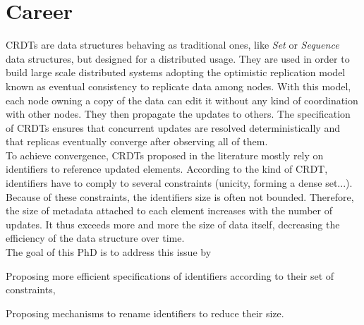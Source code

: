\documentclass[]{deedy-resume-openfont}
\begin{document}
%
%

%
%

%
%


\section{Career}

\sectionsep

\hfill\begin{minipage}{\dimexpr\textwidth-0.5cm}

\acp{CRDT} are data structures behaving as traditional ones, like \emph{Set} or \emph{Sequence} data structures, but designed for a distributed usage.
They are used in order to build large scale distributed systems adopting the optimistic replication model known as eventual consistency to replicate data among nodes.
With this model, each node owning a copy of the data can edit it without any kind of coordination with other nodes.
They then propagate the updates to others.
The specification of \acp{CRDT} ensures that concurrent updates are resolved deterministically and that replicas eventually converge after observing all of them.
\\
To achieve convergence, \acp{CRDT} proposed in the literature mostly rely on identifiers to reference updated elements.
According to the kind of \ac{CRDT}, identifiers have to comply to several constraints (unicity, forming a dense set...).
\\
Because of these constraints, the identifiers size is often not bounded.
Therefore, the size of metadata attached to each element increases with the number of updates.
It thus exceeds more and more the size of data itself, decreasing the efficiency of the data structure over time.
\\
The goal of this PhD is to address this issue by
\begin{tightemize}
  \item Proposing more efficient specifications of identifiers according to their set of constraints,
  \item Proposing mechanisms to rename identifiers to reduce their size.
\end{tightemize}
\sectionsep
\end{minipage}
\end{document}
